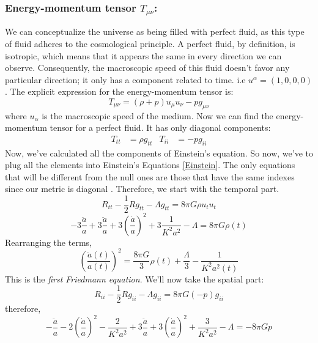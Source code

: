 \documentclass[12pt]{article}
\begin{document}
\subsubsection{Energy-momentum tensor $T_{\mu \nu}$:}
We can conceptualize the universe as being filled with perfect fluid, as this type of fluid adheres to the cosmological principle. A perfect fluid, by definition, is isotropic, which means that it appears the same in every direction we can observe. Consequently, the macroscopic speed of this fluid doesn't favor any particular direction; it only has a component related to time. i.e $u^{\alpha}=(1,0,0,0)$. The explicit expression for the energy-momentum tensor is:
\begin{equation}
T_{\mu \nu}=(\rho+p) u_{\mu} u_{\nu}-p g_{\mu \nu}
\label{43}
\end{equation}
where $u_{\alpha}$ is the macroscopic speed of the medium. Now we can find the energy-momentum tensor for a perfect fluid. It has only diagonal components:
\begin{align*}
T_{t t}&=\rho g_{t t} &  T_{i i}&=-p g_{i i}
\end{align*}
Now, we've calculated all the components of Einstein's equation. So now, we've to plug all the elements into Einstein's Equations \eqref{Einstein}. The only equations that will be different from the null ones are those that have the same indexes since our metric is diagonal \cite{narlikar_hoyle_cosmology}. Therefore, we start with the temporal part.
\begin{equation}
R_{t t}-\frac{1}{2} R g_{t t}-\Lambda g_{t t}=8 \pi G \rho u_{t} u_{t}
\label{44}
\end{equation}
\begin{equation}
-3 \frac{\ddot{a}}{a}+3 \frac{\ddot{a}}{a}+3\left(\frac{\dot{a}}{a}\right)^{2}+3 \frac{1}{K^{2} a^{2}}-\Lambda=8 \pi G \rho(t)\label{45}
\end{equation}
Rearranging the terms,
\begin{equation}
\left(\frac{\dot{a}(t)}{a(t)}\right)^{2}=\frac{8 \pi G}{3} \rho(t)+\frac{\Lambda}{3}-\frac{1}{K^{2} a^{2}(t)}
\label{Eqsub}
\end{equation}
This is the \textit{first Friedmann equation}. We'll now take the spatial part:
\begin{equation}
R_{i i}-\frac{1}{2} R g_{i i}-\Lambda g_{i i}=8 \pi G(-p) g_{i i}
\label{47}
\end{equation}
therefore,
\begin{equation}
-\frac{\ddot{a}}{a}-2\left(\frac{\dot{a}}{a}\right)^{2}-\frac{2}{K^{2} a^{2}}+3 \frac{\ddot{a}}{a}+3\left(\frac{\dot{a}}{a}\right)^{2}+\frac{3}{K^{2} a^{2}}-\Lambda=-8 \pi G p
\label{48}
\end{equation}
\end{document}
